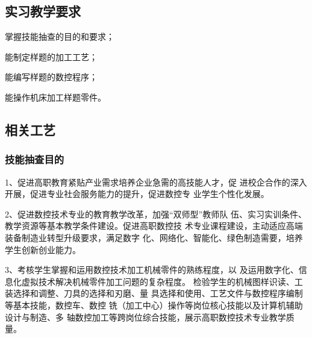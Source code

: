 \jxhj{%
	}

\makeshouye %

\subsection{实习教学要求}
\begin{compactenum}[\hspace{2em}1、]
	\item 掌握技能抽查的目的和要求；
	\item 能制定样题的加工工艺；
	\item 能编写样题的数控程序；
	\item 能操作机床加工样题零件。
\end{compactenum}

\subsection{相关工艺}
\subsubsection{技能抽查目的}

1、促进高职教育紧贴产业需求培养企业急需的高技能人才，促
进校企合作的深入开展，促进专业社会服务能力的提升，促进数控专
业学生个性化发展。

2、促进数控技术专业的教育教学改革，加强“双师型”教师队
伍、实习实训条件、教学资源等基本教学条件建设。促进高职数控技
术专业课程建设，主动适应高端装备制造业转型升级要求，满足数字
化、网络化、智能化、绿色制造需要，培养学生创新创业能力。

3、考核学生掌握和运用数控技术加工机械零件的熟练程度，以
及运用数字化、信息化虚拟技术解决机械零件加工问题的复杂程度。
检验学生的机械图样识读、工装选择和调整、刀具的选择和刃磨、量
具选择和使用、工艺文件与数控程序编制等基本技能，数控车、数控
铣（加工中心）操作等岗位核心技能以及计算机辅助设计与制造、多
轴数控加工等跨岗位综合技能，展示高职数控技术专业教学质量。

